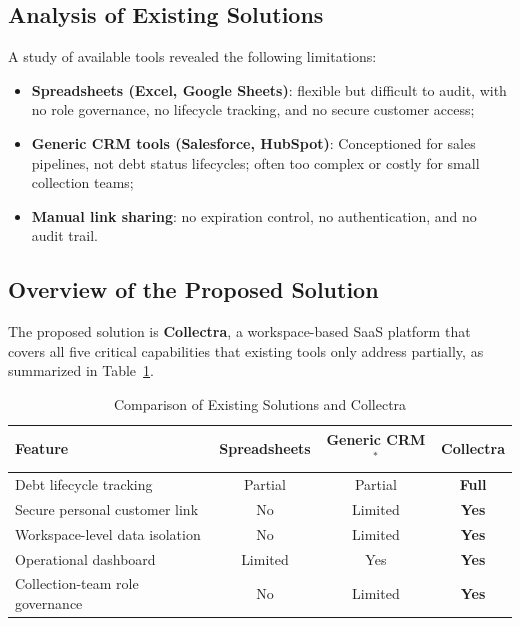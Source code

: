 \documentclass[12pt,a4paper]{report}
\begin{document}
\subsection{Analysis of Existing Solutions}

A study of available tools revealed the following limitations:
\begin{itemize}
  \item \textbf{Spreadsheets (Excel, Google Sheets)}: flexible but difficult to
        audit, with no role governance, no lifecycle tracking, and no secure
        customer access;
  \item \textbf{Generic CRM tools (Salesforce, HubSpot)}: Conceptioned for sales
        pipelines, not debt status lifecycles; often too complex or costly for
        small collection teams;
  \item \textbf{Manual link sharing}: no expiration control, no authentication,
        and no audit trail.
\end{itemize}

\subsection{Overview of the Proposed Solution}

The proposed solution is \textbf{Collectra}, a workspace-based SaaS platform that
covers all five critical capabilities that existing tools only address partially,
as summarized in Table~\ref{tab:comparison}.

\begin{table}[H]
  \centering
  \small
  \renewcommand{\arraystretch}{1.3}
  \setlength{\tabcolsep}{6pt}
  \begin{tabular}{l c c c}
    \hline
    \rowcolor{accentblue!10}
    \textbf{Feature} & \textbf{Spreadsheets} & \textbf{Generic CRM}$^{\ast}$
      & \textbf{Collectra} \\
    \hline
    Debt lifecycle tracking          & Partial & Partial & \textbf{Full} \\
    \hline
    Secure personal customer link    & No      & Limited & \textbf{Yes}  \\
    \hline
    Workspace-level data isolation   & No      & Limited & \textbf{Yes}  \\
    \hline
    Operational dashboard            & Limited & Yes     & \textbf{Yes}  \\
    \hline
    Collection-team role governance  & No      & Limited & \textbf{Yes}  \\
    \hline
  \end{tabular}
  \caption{Comparison of Existing Solutions and Collectra}
  \label{tab:comparison}
\end{table}
\end{document}
